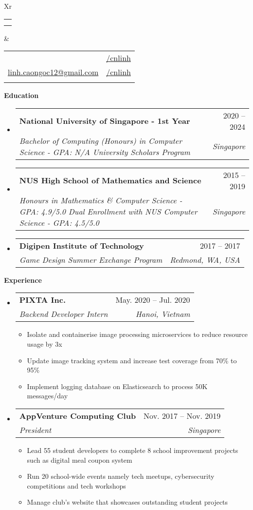 \documentclass[letterpaper,12pt]{article}[leftmargin=*]
\makeatletter
\def \fullname {Cao Ngoc Linh}
\def \subtitle {}
\def \linkedinicon {\faLinkedin}
\def \linkedinlink {https://linkedin.com/in/cnlinh/}
\def \linkedintext {/cnlinh}
\def \phoneicon {\faPhone}
\def \phonetext {+65 8106 6554}
\def \emailicon {\faEnvelope}
\def \emaillink {mailto:linh.caongoc12@gmail.com}
\def \emailtext {linh.caongoc12@gmail.com}
\def \githubicon {\faGithub}
\def \githublink {https://github.com/cnlinh}
\def \githubtext {/cnlinh}
\def \headertype {\doublecol} %
\def \entryspacing {-0pt}
\def \linkedin {\linkedinicon \hspace{3pt}\href{\linkedinlink}{\linkedintext}}
\def \phone {\phoneicon \hspace{3pt}{ \phonetext}}
\def \email {\emailicon \hspace{3pt}\href{\emaillink}{\emailtext}}
\def \github {\githubicon \hspace{3pt}\href{\githublink}{\githubtext}}
\renewcommand{\section}[2]{\vspace{5pt}
  \colorbox{secondary}{\color{white}\raggedbottom\normalsize\textbf{{#1}{\hspace{7pt}#2}}}
}
\newcommand{\resumeEntryStart}{\begin{itemize}[leftmargin=2.5mm]}
\newcommand{\resumeEntryEnd}{\end{itemize}\vspace{\entryspacing}}
\newcommand{\resumeItemListStart}{\begin{itemize}[leftmargin=4.5mm]}
\newcommand{\resumeItemListEnd}{\end{itemize}}
\newcommand{\resumeItem}[1]{
  \item\small{
    {#1 \vspace{-2pt}}
  }
}
\newcommand{\resumeEntryTSDL}[4]{
  \vspace{-1pt}\item[]
    \begin{tabularx}{0.97\textwidth}{X@{\hspace{60pt}}r}
      \textbf{\color{primary}#1} & {\firabook\color{accent}\small#2} \\
      \textit{\color{accent}\small#3} & \textit{\color{accent}\small#4} \\
    \end{tabularx}\vspace{-6pt}
}
\newcommand{\doublecol}[6]{
  \begin{tabularx}{\textwidth}{Xr}
    {
      \begin{tabular}[c]{l}
        \fontsize{35}{45}\selectfont{\color{primary}{{\textbf{\fullname}}}} \\
        {\textit{\subtitle}} %
      \end{tabular}
    } & {
      \begin{tabular}[c]{l@{\hspace{1.5em}}l}
        {\small#4} & {\small#1} \\
        {\small#5} & {\small#2} \\
        {\small#6} & {\small#3}
      \end{tabular}
    }
  \end{tabularx}
}
\newcommand{\singlecol}[6]{
  \begin{tabularx}{\textwidth}{Xr}
    {
      \begin{tabular}[b]{l}
        \fontsize{35}{45}\selectfont{\color{primary}{{\textbf{\fullname}}}} \\
        {\textit{\subtitle}} %
      \end{tabular}
    } & {
      \begin{tabular}[c]{l}
        {\small#1} \\
        {\small#2} \\
        {\small#3} \\
        {\small#4} \\
        {\small#5} \\
        {\small#6}
      \end{tabular}
    }
  \end{tabularx}
}
\makeatother
\begin{document}


\headertype{\linkedin}{\github}{}{\phone}{\email}{} %
\vspace{-10pt} %

\section{\faGraduationCap}{Education}

  \resumeEntryStart
    \resumeEntryTSDL
      {National University of Singapore - 1st Year}{2020 -- 2024}
      {Bachelor of Computing (Honours) in Computer Science - GPA: N/A \newline University Scholars Program} {Singapore}
    \resumeEntryTSDL
      {NUS High School of Mathematics and Science}{2015 -- 2019}
      {Honours in Mathematics \& Computer Science - GPA: 4.9/5.0 
      \newline Dual Enrollment with NUS Computer Science - GPA: 4.5/5.0}{Singapore}
    \resumeEntryTSDL
      {Digipen Institute of Technology}{2017 -- 2017}
      {Game Design Summer Exchange Program} {Redmond, WA, USA}
    
  \resumeEntryEnd

\section{\faPieChart}{Experience}

  \resumeEntryStart
    \resumeEntryTSDL
      {PIXTA Inc.}{May. 2020 -- Jul. 2020}
      {Backend Developer Intern}{Hanoi, Vietnam}
    \resumeItemListStart
        \resumeItem {Isolate and containerise image processing microservices to reduce resource usage by 3x}
        \resumeItem {Update image tracking system and increase test coverage from 70\% to 95\%}
        \resumeItem {Implement logging database on Elasticsearch to process 50K messages/day}
    \resumeItemListEnd
  \resumeEntryEnd
  
  \resumeEntryStart
    \resumeEntryTSDL
      {AppVenture Computing Club}{Nov. 2017 -- Nov. 2019}
      {President}{Singapore}
    \resumeItemListStart
        \resumeItem {Lead 55 student developers to complete 8 school improvement projects such as digital meal coupon system}
        \resumeItem {Run 20 school-wide events namely tech meetups, cybersecurity competitions and tech workshops}
        \resumeItem {Manage club's website that showcases outstanding student projects}
    \resumeItemListEnd
  \resumeEntryEnd
\end{document}
